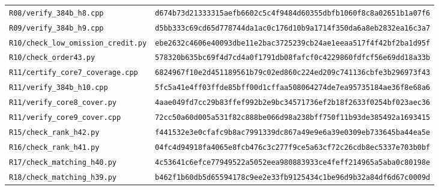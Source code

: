 \documentclass[11pt,a4paper]{article}
\theoremstyle{definition}\newtheorem{definition}[theorem]{Definition}
\theoremstyle{remark}\newtheorem{remark}[theorem]{Remark}
\begin{document}
\begin{longtable}{p{}p{}}
\nolinkurl{R08/verify_384b_h8.cpp} & \texttt{d674b73d21333315aefb6602c5c4f948}\newline\texttt{4d60355dbfb1060f8c8a02651b1a07f6}\\[3pt]
\nolinkurl{R09/verify_384b_h9.cpp} & \texttt{d5bb333c69cd65d778744da1ac0c176d}\newline\texttt{10b9a1714f350da6a8eb2832ea16c3a7}\\[3pt]
\nolinkurl{R10/check_low_omission_credit.py} & \texttt{ebe2632c4606e40093dbe11e2bac3725}\newline\texttt{239cb24ae1eeaa517f4f42bf2ba1d95f}\\[3pt]
\nolinkurl{R10/check_order43.py} & \texttt{578320b635bc69f4d7cd4a0f1791db08}\newline\texttt{fafcf0c4229860fdfcf56e69dd18a33b}\\[3pt]
\nolinkurl{R11/certify_core7_coverage.cpp} & \texttt{6824967f10e2d451189561b79c02ed86}\newline\texttt{0c224ed209c741136cbfe3b296973f43}\\[3pt]
\nolinkurl{R11/verify_384b_h10.cpp} & \texttt{5fc5a41e4ff03ffde85bff00d1cffaa5}\newline\texttt{08064274de7ea95735184ae36f8e68a6}\\[3pt]
\nolinkurl{R11/verify_core8_cover.py} & \texttt{4aae049fd7cc29b83ffef992b2e9bc34}\newline\texttt{571736ef2b18f2633f0254bf023aec36}\\[3pt]
\nolinkurl{R11/verify_core9_cover.cpp} & \texttt{72cc50a60d005a531f82c888be066d98}\newline\texttt{a238bff750f11b93de385492a1693415}\\[3pt]
\nolinkurl{R15/check_rank_h42.py} & \texttt{f441532e3e0cfafc9b8ac7991339dc86}\newline\texttt{7a49e9e6a39e0309eb733645ba44ea5e}\\[3pt]
\nolinkurl{R16/check_rank_h41.py} & \texttt{04fc4d94918fa4065e8fcb476c3c277f}\newline\texttt{9ce5a63cf72c26cdb8ec5337e703b0bf}\\[3pt]
\nolinkurl{R17/check_matching_h40.py} & \texttt{4c53641c6efce77949522a5052eea980}\newline\texttt{883933ce4feff214965a5aba0c80198e}\\[3pt]
\nolinkurl{R18/check_matching_h39.py} & \texttt{b462f1b60db5d65594178c9ee2e33fb9}\newline\texttt{125434c1be96d9b32a84df6d67c0009d}\\[3pt]

\end{longtable}
\end{document}
